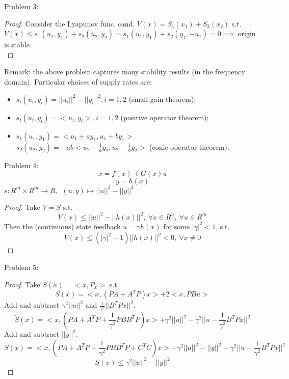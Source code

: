     Problem 3:
    \begin{proof}
        Consider the Lyapunov func. cand. $V(x) = S_1(x_1) + S_2(x_2)$ s.t. \\
        $\dot V (x) \le s_1(u_1,y_1) + s_2(u_2,y_2) = s_1(u_1,y_1) + s_2(y_1,-u_1) = 0 \implies$ origin is stable.\\
    \end{proof}
    
    Remark: the above problem captures many stability results (in the frequency domain). Particular choices of supply rates are:
    \begin{itemize}
        \item $s_i(u_i,y_i) = ||u_i||^2-||y_i||^2, i=1,2$ (small-gain theorem);
        \item $s_i(u_i,y_i) = <u_i,y_i>, i=1,2$ (positive operator theorem);
        \item $s_1(u_1,y_1) = <u_1+ay_1, u_1+by_1>$\\
        $s_2(u_2,y_2) = -ab<u_2-\frac{1}{a}y_2, u_2-\frac{1}{b}y_2>$ (conic operator theorem).
    \end{itemize}
    
    Problem 4:
    $$\dot x = f(x)+G(x)u$$
    $$y=h(x)$$
    $s: R^m \times R^m \rightarrow R, \ \ (u,y) \mapsto ||u||^2-||y||^2$
    \begin{proof}
        Take $V=S$ s.t.
        $$\dot V(x) \le ||u||^2-||h(x)||^2, \ \forall x \in R^n, \ \forall u \in R^m$$
        Then the (continuous) state feedback $u = \gamma h(x)$ for some $|\gamma|^2 < 1$, s.t.
        $$\dot V(x) \le (|\gamma|^2-1)||h(x)||^2 < 0, \ \forall x \neq 0$$
    \end{proof}
    
    Problem 5:
    \begin{proof}
        Take $S(x) = <x,P_x>$ s.t. 
        $$\dot S(x) = <x, (PA+A^TP)x>+2<x,PBu>$$
        Add and subtract $\gamma^2||u||^2$ and $\frac{1}{\gamma^2}||B^TPx||^2$.
        $$\dot S(x) = <x, (PA+A^TP+\frac{1}{\gamma^2}PBB^TP)x>+\gamma^2||u||^2-\gamma^2||u -\frac{1}{\gamma^2}B^TPx||^2$$
        Add and subtract $||y||^2$.
        $$\dot S(x) = <x, (PA+A^TP+\frac{1}{\gamma^2}PBB^TP+C^TC)x>+\gamma^2||u||^2-||y||^2-\gamma^2||u-\frac{1}{\gamma^2}B^TPx||^2$$
        $$\dot S(x) \le \gamma^2||u||^2-||y||^2$$
    \end{proof}
    
